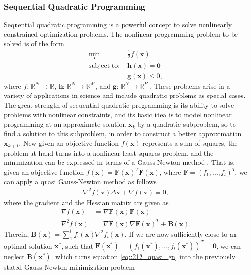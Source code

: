 \subsubsection{Sequential Quadratic Programming}
\label{sec::212_sqp}
Sequential quadratic programming is a powerful concept to solve nonlinearly constrained optimization problems. The nonlinear programming problem to be solved is of the form
\begin{align}
	\min_{\bm{x}}\, &\frac{1}{2}f(\bm{x})
	\label{eq::212_objective}\\
	\text{subject to: } &\bm{h}(\bm{x}) = \bm{0}\\
	&\bm{g}(\bm{x}) \leq \bm{0},
\end{align}
where $f:\,\mathbb{R}^N\rightarrow\mathbb{R}$, $\bm{h}:\,\mathbb{R}^N\rightarrow\mathbb{R}^M$, and $\bm{g}:\,\mathbb{R}^N\rightarrow\mathbb{R}^P$ \cite{boggs1995sequential}. These problems arise in a variety of applications in science and include quadratic problems as special cases. The great strength of sequential quadratic programming is its ability to solve problems with nonlinear constraints, and its basic idea is to model nonlinear programming at an approximate solution $\bm{x}_k$ by a quadratic subproblem, so to find a solution to this subproblem, in order to construct a better approximation $\bm{x}_{k+1}$. Now given an objective function $f(\bm{x})$ represents a sum of squares, the problem at hand turns into a nonlinear least squares problem, and the minimization can be expressed in terms of a Gauss-Newton method \cite{schittkowski1988solving}. That is, given an objective function $f(\bm{x}) = \bm{F}(\bm{x})^T\bm{F}(\bm{x})$, where $\bm{F}=\left(f_1,...,f_l\right)^T$, we can apply a quasi Gauss-Newton method as follows
\begin{align}
	\nabla^2f(\bm{x})\Delta\bm{x} + \nabla f(\bm{x}) = 0,
	\label{eq::212_quasi_gn}
\end{align}
where the gradient and the Hessian matrix are given as
\begin{align}
	\nabla f(\bm{x}) &= \nabla \bm{F}(\bm{x})\bm{F}(\bm{x}) \\
	\nabla^2 f(\bm{x}) &= \nabla \bm{F}(\bm{x})\nabla\bm{F}(\bm{x})^T + \bm{B}(\bm{x}).
\end{align}
Therein, $\bm{B}(\bm{x}) = \sum_1^lf_i(\bm{x})\nabla^2f_i(\bm{x})$. If we are now sufficiently close to an optimal solution $\bm{x}^*$, such that $\bm{F}(\bm{x}^*) = \left(f_1(\bm{x}^*),...,f_l(\bm{x}^*)\right)^T=\bm{0}$, we can neglect $\bm{B}(\bm{x^*})$, which turns equation \ref{eq::212_quasi_gn} into the previously stated Gauss-Newton minimization problem

